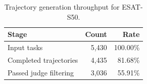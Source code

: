 \begin{table}[t]
\centering
\small
{\begin{tabular}{lrr}
\toprule
\textbf{Stage} & \textbf{Count} & \textbf{Rate} \\
\midrule
Input tasks & 5,430 & 100.00\% \\
Completed trajectories &  4,435 & 81.68\% \\
Passed judge filtering  & 3,036 & 55.91\% \\
\bottomrule
\end{tabular}
}
\caption{Trajectory generation throughput for \textsc{ESAT}-S50.}
\label{tab:syn_traj_througput}
\end{table}
